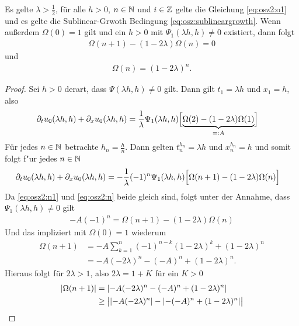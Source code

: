 \begin{lemma}\label{lem:osz2:omega_n}
Es gelte $\lambda > \frac 12$, für alle $h > 0$, $n \in \mathbb N$ und $i \in \mathbb Z$ gelte die Gleichung \eqref{eq:osz2:o1} und es gelte die Sublinear-Grwoth Bedingung \eqref{eq:osz:sublineargrowth}.
Wenn außerdem $\Omega(0) = 1$ gilt und ein $h > 0$ mit $\Psi_1(\lambda h, h) \neq 0$ existiert, dann folgt
\begin{align*}
\Omega(n+1) - ( 1 - 2 \lambda ) \Omega(n) = 0
\end{align*}
und
\begin{align*}
\Omega(n) = (1 - 2 \lambda)^n.
\end{align*}
\end{lemma}
\begin{proof}
Sei $h > 0$ derart, dass $\Psi(\lambda h, h) \neq 0$ gilt. Dann gilt $t_1 = \lambda h$ und $x_1 = h$, also
\begin{align}\label{eq:osz2:n1}
\partial_t u_0(\lambda h, h) + \partial_x u_0(\lambda h, h) &= \frac 1 \lambda \Psi_1(\lambda h, h) \Bigl[ \underbrace{\Omega(2) - ( 1 - 2 \lambda ) \Omega(1)}_{=: A} \Bigr]
\end{align}
Für jedes $n \in \mathbb N$ betrachte $h_n = \frac h n$. Dann gelten $t^{h_n}_n = \lambda h$ und $x^{h_n}_n = h$ und somit folgt f"ur jedes $n \in \mathbb N$
\begin{align}\label{eq:osz2:n}
\partial_t u_0(\lambda h, h) + \partial_x u_0(\lambda h, h) &= - \frac 1 \lambda (-1)^n \Psi_1(\lambda h, h) \Bigl[ \Omega(n+1) - ( 1 - 2 \lambda ) \Omega(n) \Bigr]
\end{align}
Da \eqref{eq:osz2:n1} und \eqref{eq:osz2:n} beide gleich sind, folgt unter der Annahme, dass {\color{red}$\Psi_1(\lambda h, h) \neq 0$} gilt
\begin{align}\label{eq:osz:omegan}
-A (-1)^n = \Omega(n+1) - ( 1 - 2 \lambda ) \Omega(n)
\end{align}
Und das impliziert mit {\color{red} $\Omega(0) = 1$} wiederum
\begin{align}\nonumber
\Omega(n+1) &= -A \sum_{k=1}^n (-1)^{n-k} (1 - 2 \lambda)^k + (1 - 2 \lambda)^n\\
&= -A (- 2 \lambda)^n - (-A)^n + (1 - 2 \lambda)^n.
\end{align}
Hieraus folgt für $2 \lambda > 1$, also $2\lambda = 1 + K$ für ein $K > 0$
\begin{align*}
\abs{\Omega(n+1)} &= \abs{-A (- 2 \lambda)^n -(-A)^n + (1 - 2 \lambda)^n}\\
&\geq \bigl\lvert \abs{-A (- 2 \lambda)^n} - \abs{-(-A)^n + (1 - 2 \lambda)^n} \bigr\rvert\\

\end{align*}
\end{proof}
